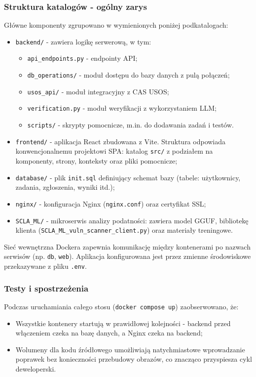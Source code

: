 \documentclass[12pt,a4paper]{article}
\begin{document}
\subsubsection{Struktura katalogów - ogólny zarys}
Główne komponenty zgrupowano w wymienionych poniżej podkatalogach:
\begin{itemize}
    \item \texttt{backend/} - zawiera logikę serwerową, w tym: 
        \begin{itemize}
            \item \texttt{api\_endpoints.py} - endpointy API;
            \item \texttt{db\_operations/} - moduł dostępu do bazy danych  z pulą połączeń;
            \item \texttt{usos\_api/} - moduł integracyjny z CAS USOS;
            \item \texttt{verification.py} - moduł weryfikacji z wykorzystaniem LLM;
            \item \texttt{scripts/} - skrypty pomocnicze, m.in. do dodawania zadań i testów.
        \end{itemize}
    \item \texttt{frontend/} - aplikacja React zbudowana z Vite. Struktura odpowiada konwencjonalnemu projektowi SPA: katalog \texttt{src/} z podziałem na komponenty, strony, konteksty oraz pliki pomocnicze;
    \item \texttt{database/} - plik \texttt{init.sql} definiujący schemat bazy (tabele: użytkownicy, zadania, zgłoszenia, wyniki itd.);
    \item \texttt{nginx/} - konfiguracja Nginx (\texttt{nginx.conf}) oraz certyfikat SSL;
    \item \texttt{SCLA\_ML/} - mikroserwis analizy podatności: zawiera model GGUF, bibliotekę klienta (\texttt{SCLA\_ML\_vuln\_scanner\_client.py}) oraz materiały treningowe.
\end{itemize}

Sieć wewnętrzna Dockera zapewnia komunikację między kontenerami po nazwach serwisów (np. \texttt{db}, \texttt{web}). Aplikacja konfigurowana jest przez zmienne środowiskowe przekazywane z pliku \texttt{.env}.

\subsubsection{Testy i spostrzeżenia}
Podczas uruchamiania całego stosu (\texttt{docker compose up}) zaobserwowano, że:
\begin{itemize}
    \item Wszystkie kontenery startują w prawidłowej kolejności - backend przed włączeniem czeka na bazę danych, a Nginx czeka na backend;
    \item Wolumeny dla kodu źródłowego umożliwiają natychmiastowe wprowadzanie poprawek bez konieczności przebudowy obrazów, co znacząco przyspiesza cykl deweloperski.
\end{itemize}
\end{document}
